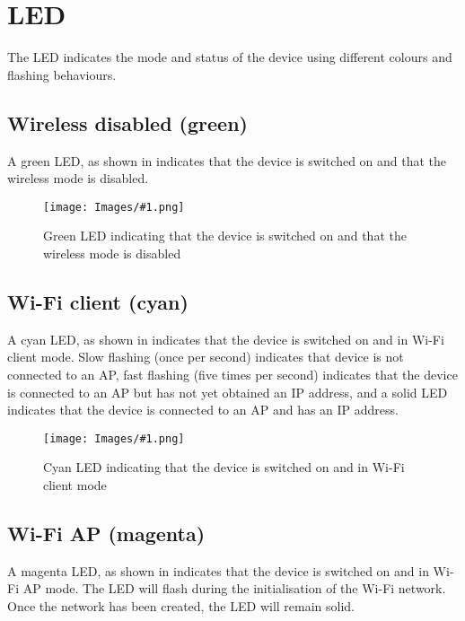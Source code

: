 \section{\acs{LED}}
\label{sec:led}

The \ac{LED} indicates the mode and status of the device using different colours and flashing behaviours.

\newcommand{\ledFigure}[2]{
    \begin{figure}[H]
        \centering
        \texttt{[image: Images/\#1.png]}
        \caption{#2}
        \label{fig:#1}
    \end{figure}
}

\subsection{Wireless disabled (green)}

A green \ac{LED}, as shown in  indicates that the device is switched on and that the wireless mode is disabled.

\ledFigure{greenLed}{Green \acs{LED} indicating that the device is switched on and that the wireless mode is disabled}

\subsection{Wi-Fi client (cyan)}

A cyan \ac{LED}, as shown in  indicates that the device is switched on and in Wi-Fi client mode. Slow flashing (once per second) indicates that device is not connected to an \ac{AP}, fast flashing (five times per second) indicates that the device is connected to an \ac{AP} but has not yet obtained an \ac{IP} address, and a solid \ac{LED} indicates that the device is connected to an \ac{AP} and has an \ac{IP} address.

\ledFigure{cyanLed}{Cyan \acs{LED} indicating that the device is switched on and in Wi-Fi client mode}

\subsection{Wi-Fi AP (magenta)}

A magenta \ac{LED}, as shown in  indicates that the device is switched on and in Wi-Fi \ac{AP} mode.  The \ac{LED} will flash during the initialisation of the Wi-Fi network.  Once the network has been created, the \ac{LED} will remain solid.


